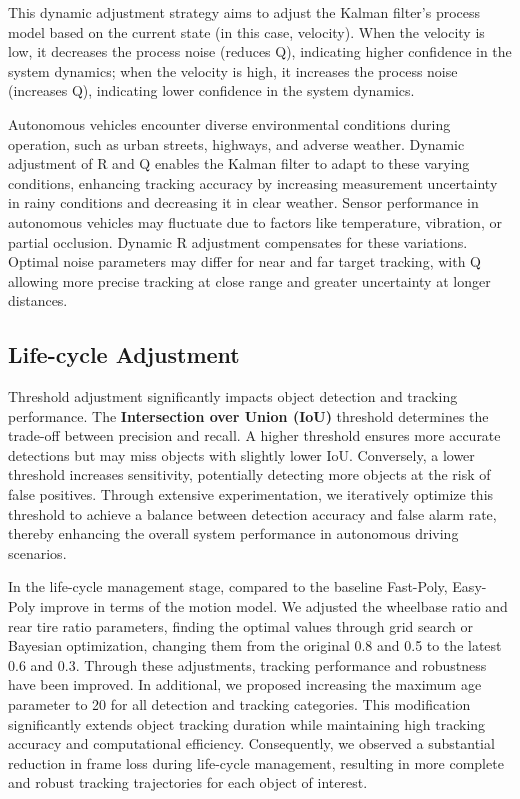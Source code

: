 This dynamic adjustment strategy aims to adjust the Kalman filter's process model based on the current state (in this case, velocity). When the velocity is low, it decreases the process noise (reduces Q), indicating higher confidence in the system dynamics; when the velocity is high, it increases the process noise (increases Q), indicating lower confidence in the system dynamics.

Autonomous vehicles encounter diverse environmental conditions during operation, such as urban streets, highways, and adverse weather. Dynamic adjustment of R and Q enables the Kalman filter to adapt to these varying conditions, enhancing tracking accuracy by increasing measurement uncertainty in rainy conditions and decreasing it in clear weather. Sensor performance in autonomous vehicles may fluctuate due to factors like temperature, vibration, or partial occlusion. Dynamic R adjustment compensates for these variations. Optimal noise parameters may differ for near and far target tracking, with Q allowing more precise tracking at close range and greater uncertainty at longer distances.


\subsection{Life-cycle Adjustment}

Threshold adjustment significantly impacts object detection and tracking performance. The \textbf{Intersection over Union (IoU)} threshold determines the trade-off between precision and recall. A higher threshold ensures more accurate detections but may miss objects with slightly lower IoU. Conversely, a lower threshold increases sensitivity, potentially detecting more objects at the risk of false positives. Through extensive experimentation, we iteratively optimize this threshold to achieve a balance between detection accuracy and false alarm rate, thereby enhancing the overall system performance in autonomous driving scenarios.

In the life-cycle management stage, compared to the baseline Fast-Poly, Easy-Poly improve in terms of the motion model. We adjusted the wheelbase ratio and rear tire ratio parameters, finding the optimal values through grid search or Bayesian optimization, changing them from the original 0.8 and 0.5 to the latest 0.6 and 0.3. Through these adjustments, tracking performance and robustness have been improved. In additional, we proposed increasing the maximum age parameter to 20 for all detection and tracking categories. This modification significantly extends object tracking duration while maintaining high tracking accuracy and computational efficiency. Consequently, we observed a substantial reduction in frame loss during life-cycle management, resulting in more complete and robust tracking trajectories for each object of interest.



